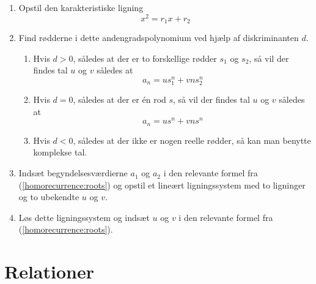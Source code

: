 \documentclass[a4paper]{article}
\begin{document}
\begin{enumerate}

\item Opstil den karakteristiske ligning $$x^2 = r_1x + r_2$$

\item Find rødderne i dette andengradspolynomium ved hjælp af diskriminanten $d$.
\label{homorecurrence:roots}

\begin{enumerate}
\item Hvis $d > 0$, således at der er to forskellige rødder $s_1$ og $s_2$, så vil der
findes tal $u$ og $v$ således at $$a_n = us_1^n + vns_2^n$$

\item Hvis $d = 0$, således at der er én rod $s$, så vil der findes tal $u$ og $v$ således
at $$a_n = us^n + vns^n$$

\item Hvis $d < 0$, således at der ikke er nogen reelle rødder, så kan man benytte komplekse
tal.
\end{enumerate}

\item Indsæt begyndelsesværdierne $a_1$ og $a_2$ i den relevante formel fra (\ref{homorecurrence:roots})
og opstil et lineært ligningssystem med to ligninger og to ubekendte $u$ og $v$.

\item Løs dette ligningssystem og indsæt $u$ og $v$ i den relevante formel fra
(\ref{homorecurrence:roots}).

\end{enumerate}

\section{Relationer}
\end{document}
